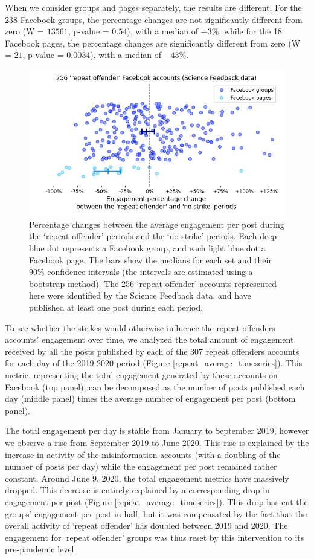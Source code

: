 \documentclass[review]{elsarticle}
\begin{document}
When we consider groups and pages separately, the results are different.
For the 238 Facebook groups, the percentage changes are not significantly different from zero (W = $13561$, p-value = $0.54$), with a median of $-3\%$, while for the 18 Facebook pages, the percentage changes are significantly different from zero (W = $21$, p-value = $0.0034$), with a median of $-43\%$.

\begin{figure}[!h]
\centering
\includegraphics[scale=0.5]{./../figure/sf_repeat_vs_free_percentage_change.png}
\caption{
Percentage changes between the average engagement per post during the `repeat offender' periods and the `no strike' periods.
Each deep blue dot represents a Facebook group, and each light blue dot a Facebook page.
The bars show the medians for each set and their $90\%$ confidence intervals (the intervals are estimated using a bootstrap method).
The 256 `repeat offender' accounts represented here were identified by the Science Feedback data, and have published at least one post during each period.
}
\label{repeat_vs_free_percentage_change}
\end{figure}

To see whether the strikes would otherwise influence the repeat offenders accounts' engagement over time, we analyzed the total amount of engagement received by all the posts published by each of the 307 repeat offenders accounts for each day of the 2019-2020 period (Figure \ref{repeat_average_timeseries}). 
This metric, representing the total engagement generated by these accounts on Facebook (top panel), can be decomposed as the number of posts published each day (middle panel) times the average number of engagement per post (bottom panel).

The total engagement per day is stable from January to September 2019, however we observe a rise from September 2019 to June 2020. 
This rise is explained by the increase in activity of the misinformation accounts (with a doubling of the number of posts per day) while the engagement per post remained rather constant.
Around June 9, 2020, the total engagement metrics have massively dropped.
This decrease is entirely explained by a corresponding drop in engagement per post (Figure \ref{repeat_average_timeseries}).
This drop has cut the groups' engagement per post in half, but it was compensated by the fact that the overall activity of `repeat offender' has doubled between 2019 and 2020.
The engagement for `repeat offender' groups was thus reset by this intervention to its pre-pandemic level.
\end{document}
